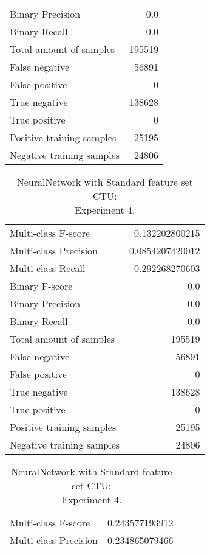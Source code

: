 \begin{table}[H]
\begin{minipage}{0.5\textwidth}
\begin{tabular}{l r}
Binary Precision & 0.0 \\
Binary Recall & 0.0 \\
\midrule
Total amount of samples & 195519 \\
False negative & 56891 \\
False positive & 0 \\
True negative & 138628 \\
True positive & 0 \\
\midrule
Positive training samples & 25195 \\
Negative training samples & 24806 \\
\bottomrule
\end{tabular}
\end{minipage}
\end{table}
\begin{table}[H]
\begin{minipage}{0.5\textwidth}
\caption{NeuralNetwork with Standard feature set CTU: \\Experiment 3.}
\centering
\begin{tabular}{l r}
\toprule
Multi-class F-score & 0.132202800215 \\
Multi-class Precision & 0.0854207420012 \\
Multi-class Recall & 0.292268270603 \\
\midrule
Binary F-score & 0.0 \\
Binary Precision & 0.0 \\
Binary Recall & 0.0 \\
\midrule
Total amount of samples & 195519 \\
False negative & 56891 \\
False positive & 0 \\
True negative & 138628 \\
True positive & 0 \\
\midrule
Positive training samples & 25195 \\
Negative training samples & 24806 \\
\bottomrule
\end{tabular}
\end{minipage}
\hfillx
\begin{minipage}{0.5\textwidth}
\caption{NeuralNetwork with Standard feature set CTU: \\Experiment 4.}
\centering
\begin{tabular}{l r}
\toprule
Multi-class F-score & 0.243577193912 \\
Multi-class Precision & 0.234865079466 \\

\end{tabular}
\end{minipage}
\end{table}
